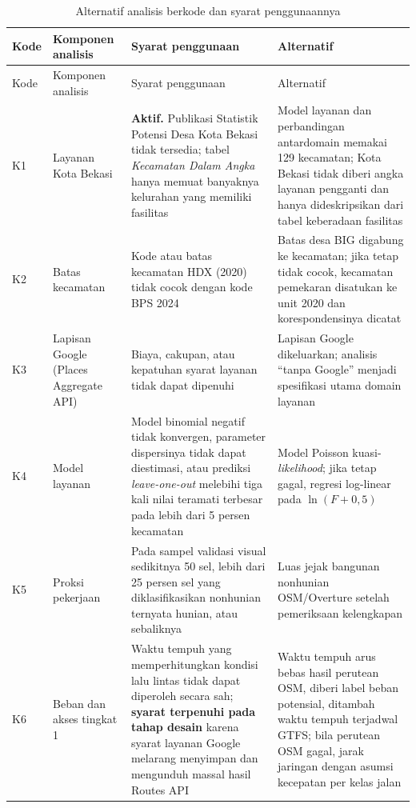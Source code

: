 \documentclass[12pt,a4paper,oneside,openany,indonesian]{report}
\begin{document}
\begingroup
\footnotesize
\begin{longtable}{>{\raggedright\arraybackslash}p{} >{\raggedright\arraybackslash}p{} >{\raggedright\arraybackslash}p{} >{\raggedright\arraybackslash}p{}}
\caption{Alternatif analisis berkode dan syarat penggunaannya}\label{tab:bab3-cadangan}\\
\toprule
Kode & Komponen analisis & Syarat penggunaan & Alternatif \\
\midrule
\endfirsthead
\toprule
Kode & Komponen analisis & Syarat penggunaan & Alternatif \\
\midrule
\endhead
\bottomrule
\endlastfoot
K1 & Layanan Kota Bekasi & \textbf{Aktif.} Publikasi Statistik Potensi Desa Kota Bekasi tidak tersedia; tabel \emph{Kecamatan Dalam Angka} hanya memuat banyaknya kelurahan yang memiliki fasilitas & Model layanan dan perbandingan antardomain memakai 129 kecamatan; Kota Bekasi tidak diberi angka layanan pengganti dan hanya dideskripsikan dari tabel keberadaan fasilitas \\
K2 & Batas kecamatan & Kode atau batas kecamatan HDX (2020) tidak cocok dengan kode BPS 2024 & Batas desa BIG digabung ke kecamatan; jika tetap tidak cocok, kecamatan pemekaran disatukan ke unit 2020 dan korespondensinya dicatat \\
K3 & Lapisan Google (Places Aggregate API) & Biaya, cakupan, atau kepatuhan syarat layanan tidak dapat dipenuhi & Lapisan Google dikeluarkan; analisis ``tanpa Google'' menjadi spesifikasi utama domain layanan \\
K4 & Model layanan & Model binomial negatif tidak konvergen, parameter dispersinya tidak dapat diestimasi, atau prediksi \emph{leave-one-out} melebihi tiga kali nilai teramati terbesar pada lebih dari 5 persen kecamatan & Model Poisson kuasi-\emph{likelihood}; jika tetap gagal, regresi log-linear pada $\ln(F+0{,}5)$ \\
K5 & Proksi pekerjaan & Pada sampel validasi visual sedikitnya 50 sel, lebih dari 25 persen sel yang diklasifikasikan nonhunian ternyata hunian, atau sebaliknya & Luas jejak bangunan nonhunian OSM/Overture setelah pemeriksaan kelengkapan \\
K6 & Beban dan akses tingkat 1 & Waktu tempuh yang memperhitungkan kondisi lalu lintas tidak dapat diperoleh secara sah; \textbf{syarat terpenuhi pada tahap desain} karena syarat layanan Google melarang menyimpan dan mengunduh massal hasil Routes API & Waktu tempuh arus bebas hasil perutean OSM, diberi label beban potensial, ditambah waktu tempuh terjadwal GTFS; bila perutean OSM gagal, jarak jaringan dengan asumsi kecepatan per kelas jalan \\

\end{longtable}
\end{document}
